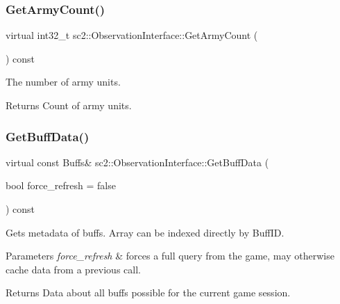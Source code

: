 \subsubsection{\texorpdfstring{Get\+Army\+Count()}{GetArmyCount()}}
{\footnotesize\ttfamily virtual int32\+\_\+t sc2\+::\+Observation\+Interface\+::\+Get\+Army\+Count (\begin{DoxyParamCaption}{ }\end{DoxyParamCaption}) const\hspace{0.3cm}{\ttfamily [pure virtual]}}

The number of army units. \begin{DoxyReturn}{Returns}
Count of army units. 
\end{DoxyReturn}
\mbox{\label{classsc2_1_1_observation_interface_a1b891d52ce1fe82dac0288797ad3720a}} 
\subsubsection{\texorpdfstring{Get\+Buff\+Data()}{GetBuffData()}}
{\footnotesize\ttfamily virtual const Buffs\& sc2\+::\+Observation\+Interface\+::\+Get\+Buff\+Data (\begin{DoxyParamCaption}\item[{bool}]{force\+\_\+refresh = {\ttfamily false} }\end{DoxyParamCaption}) const\hspace{0.3cm}{\ttfamily [pure virtual]}}

Gets metadata of buffs. Array can be indexed directly by Buff\+ID. 
\begin{DoxyParams}{Parameters}
{\em force\+\_\+refresh} & forces a full query from the game, may otherwise cache data from a previous call. \\
\hline
\end{DoxyParams}
\begin{DoxyReturn}{Returns}
Data about all buffs possible for the current game session. 
\end{DoxyReturn}
\mbox{\label{classsc2_1_1_observation_interface_ae0415e17a101e959a412e97f5db39358}} 

